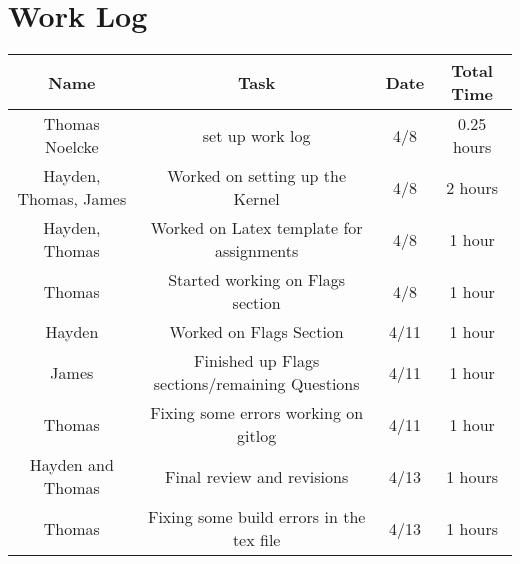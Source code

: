 \documentclass[draftclsnofoot, onecolumn, compsoc, 10pt]{IEEEtran}
\begin{document}
\section{Work Log}
		\begin{center}
			\begin{tabular}{||c c c c ||}
			\hline
			Name & Task & Date & Total Time\\[0.5ex]
			\hline \hline
			Thomas Noelcke & set up work log & 4/8 & 0.25 hours\\
			\hline
			Hayden, Thomas, James & Worked on setting up the Kernel & 4/8 & 2 hours\\
			\hline
			Hayden, Thomas & Worked on Latex template for assignments & 4/8 & 1 hour\\
      \hline
			Thomas & Started working on Flags section & 4/8 & 1 hour\\
			\hline
			Hayden & Worked on Flags Section & 4/11 & 1 hour\\
			\hline
      James & Finished up Flags sections/remaining Questions & 4/11 & 1 hour\\
      \hline
			Thomas & Fixing some errors working on gitlog & 4/11 & 1 hour\\
			\hline
			Hayden and Thomas & Final review and revisions & 4/13 & 1 hours\\
			\hline
			Thomas & Fixing some build errors in the tex file & 4/13 & 1 hours\\
			\hline
			\end{tabular}
		\end{center}
	


\newpage

\end{document}

